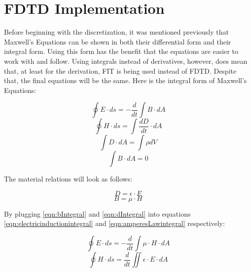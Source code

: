\section{FDTD Implementation}

Before beginning with the discretization, it was mentioned previously that Maxwell's Equations can be shown in both their differential form and their integral form. Using this form has the benefit that the equations are easier to work with and follow. Using integrals instead of derivatives, however, does mean that, at least for the derivation, FIT is being used instead of FDTD. Despite that, the final equations will be the same. Here is the integral form of Maxwell's Equations:


\begin{equation}
	\label{eqn:electricinductionintegral}
	\oint E \cdot ds = - \frac{d}{dt} \int B \cdot dA
\end{equation}
\begin{equation}
	\label{eqn:amperesLawintegral}
	\oint H \cdot ds = \int \frac{dD}{dt} \cdot dA
\end{equation}
\begin{equation}
	\label{eqn:magneticDivergenceintegral}
	\int D \cdot dA = \int \rho dV
\end{equation}
\begin{equation}
	\label{eqn:gausslawintegral}
	\int B \cdot dA = 0
\end{equation}

The material relations will look as follows:

\begin{equation}
	\label{eqn:dIntegral}
	D = \epsilon \cdot E
\end{equation}
\begin{equation}
	\label{eqn:bIntegral}
	B = \mu \cdot H
\end{equation}

By plugging \ref{eqn:bIntegral} and \ref{eqn:dIntegral} into equations \ref{eqn:electricinductionintegral} and \ref{eqn:amperesLawintegral} respectively:

\begin{equation}
	\label{eqn:electricUpdateIntegral}
	\oint E \cdot ds = - \frac{d}{dt} \int \mu \cdot H \cdot dA
\end{equation}
\begin{equation}
	\label{eqn:magneticUpdateIntegral}
	\oint H \cdot ds = \frac{d}{dt} \iint \epsilon \cdot E \cdot dA
\end{equation}

